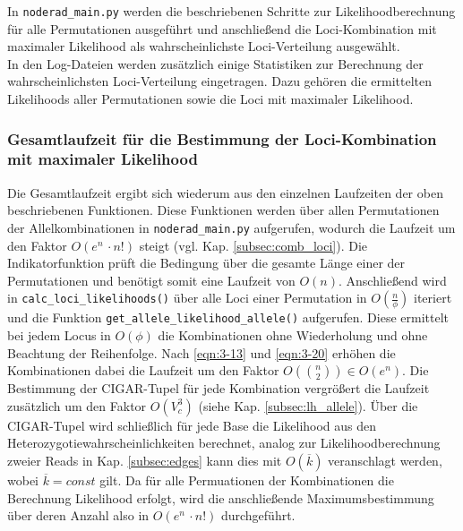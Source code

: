 In \lstinline|noderad_main.py| werden die beschriebenen Schritte zur Likelihoodberechnung für alle Permutationen ausgeführt und anschließend die Loci-Kombination mit maximaler Likelihood als wahrscheinlichste Loci-Verteilung ausgewählt.\\

In den Log-Dateien werden zusätzlich einige Statistiken zur Berechnung der wahrscheinlichsten Loci-Verteilung eingetragen. Dazu gehören die ermittelten Likelihoods aller Permutationen sowie die Loci mit maximaler Likelihood. \\
 

\subsubsection{Gesamtlaufzeit für die Bestimmung der Loci-Kombination mit maximaler Likelihood}
Die Gesamtlaufzeit ergibt sich wiederum aus den einzelnen Laufzeiten der oben beschriebenen Funktionen. Diese Funktionen werden über allen Permutationen der Allelkombinationen in \lstinline|noderad_main.py| aufgerufen, wodurch die Laufzeit um den Faktor $ O(e^n \, \cdotp n!)$ steigt (vgl. Kap. \ref{subsec:comb_loci}). Die Indikatorfunktion prüft die Bedingung über die gesamte Länge einer der Permutationen und benötigt somit eine Laufzeit von $ O(n) $. Anschließend wird in \lstinline|calc_loci_likelihoods()| über alle Loci einer Permutation in $ O(\frac{n}{\phi}) $ iteriert und die Funktion \lstinline|get_allele_likelihood_allele()| aufgerufen. Diese ermittelt bei jedem Locus in $O(\phi) $ die Kombinationen ohne Wiederholung und ohne Beachtung der Reihenfolge. Nach \eqref{eqn:3-13} und \eqref{eqn:3-20} erhöhen die Kombinationen dabei die Laufzeit um den Faktor $ O(\binom{n}{2}) \in O(e^n) $. Die Bestimmung der CIGAR-Tupel für jede Kombination vergrößert die Laufzeit zusätzlich um den Faktor $O(V_{c}^3)$ (siehe Kap. \ref{subsec:lh_allele}). Über die CIGAR-Tupel wird schließlich für jede Base die Likelihood aus den Heterozygotiewahrscheinlichkeiten berechnet, analog zur Likelihoodberechnung zweier Reads in Kap. \ref{subsec:edges} kann dies mit $O(\overline{k}) $ veranschlagt werden, wobei $\overline{k}=const$ gilt. Da für alle Permuationen der Kombinationen die Berechnung Likelihood erfolgt, wird die anschließende Maximumsbestimmung über deren Anzahl also in $O(e^n\, \cdotp n!) $ durchgeführt.\\

